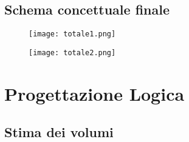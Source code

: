 \documentclass[12pt]{report}
\begin{document}
\section{Schema concettuale finale}

    \begin{figure}[p]
        \centering
        \texttt{[image: totale1.png]}
        
    \end{figure}
    
    \begin{figure}[p]
        \centering
        \texttt{[image: totale2.png]}
    \end{figure}
    
\restoregeometry

\chapter{Progettazione Logica}

\section{Stima dei volumi}
\end{document}
